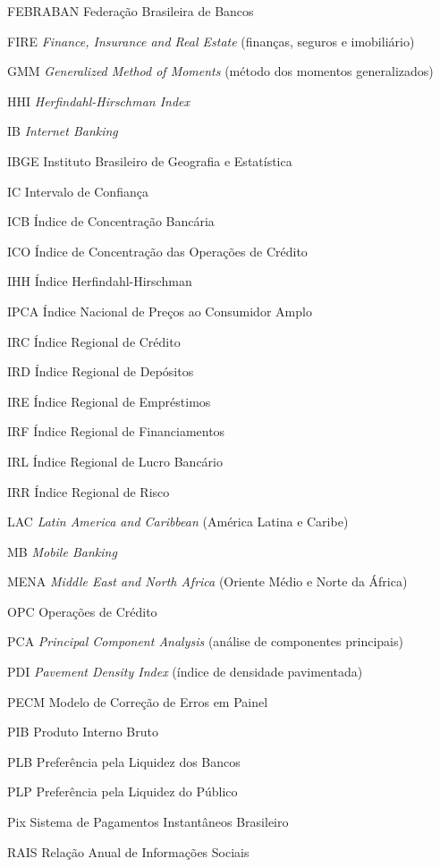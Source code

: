 \begin{spacing}{1.5}
\begin{list}{}
\item[FEBRABAN] Federação Brasileira de Bancos
\item[FIRE] \textit{Finance, Insurance and Real Estate} (finanças, seguros e imobiliário)
\item[GMM] \textit{Generalized Method of Moments} (método dos momentos generalizados)
\item[HHI] \textit{Herfindahl-Hirschman Index}
\item[IB] \textit{Internet Banking}
\item[IBGE] Instituto Brasileiro de Geografia e Estatística
\item[IC] Intervalo de Confiança
\item[ICB] Índice de Concentração Bancária
\item[ICO] Índice de Concentração das Operações de Crédito
\item[IHH] Índice Herfindahl-Hirschman
\item[IPCA] Índice Nacional de Preços ao Consumidor Amplo
\item[IRC] Índice Regional de Crédito
\item[IRD] Índice Regional de Depósitos
\item[IRE] Índice Regional de Empréstimos
\item[IRF] Índice Regional de Financiamentos
\item[IRL] Índice Regional de Lucro Bancário
\item[IRR] Índice Regional de Risco
\item[LAC] \textit{Latin America and Caribbean} (América Latina e Caribe)
\item[MB] \textit{Mobile Banking}
\item[MENA] \textit{Middle East and North Africa} (Oriente Médio e Norte da África)
\item[OPC] Operações de Crédito
\item[PCA] \textit{Principal Component Analysis} (análise de componentes principais)
\item[PDI] \textit{Pavement Density Index} (índice de densidade pavimentada)
\item[PECM] Modelo de Correção de Erros em Painel
\item[PIB] Produto Interno Bruto
\item[PLB] Preferência pela Liquidez dos Bancos
\item[PLP] Preferência pela Liquidez do Público
\item[Pix] Sistema de Pagamentos Instantâneos Brasileiro
\item[RAIS] Relação Anual de Informações Sociais

\end{list}
\end{spacing}
